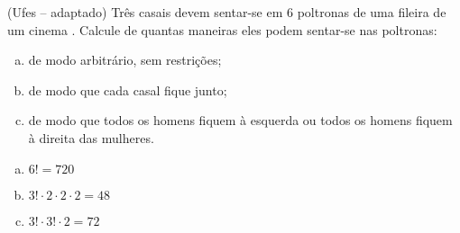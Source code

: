 \begin{ex}
(Ufes – adaptado) Três casais devem sentar-se em 6 poltronas de uma fileira de um cinema . Calcule de quantas maneiras eles podem sentar-se nas poltronas:
   \begin{enumerate}[(a)]
   \item de modo arbitrário, sem restrições;
   \item de modo que cada casal fique junto;
   \item de modo que todos os homens fiquem à esquerda ou todos os homens  fiquem à direita das mulheres.
   \end{enumerate}
    \begin{sol}
     \phantom{A}
       \begin{enumerate} [(a)]
           \item $6!=720$
           \item $3!\cdot2\cdot2\cdot2=48$
           \item $3!\cdot3!\cdot2=72$
       \end{enumerate}
    \end{sol}
\end{ex}